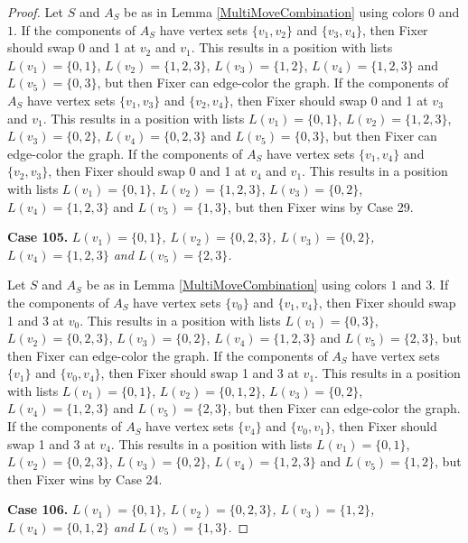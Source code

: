 \documentclass[12pt]{amsart}
\theoremstyle{plain}
\theoremstyle{definition}
\theoremstyle{remark}
\begin{document}
\begin{proof}
Let $S$ and $A_S$ be as in Lemma \ref{MultiMoveCombination} using colors $0$ and $1$. If the components of $A_S$ have vertex sets $\{v_1, v_2\}$ and $\{v_3, v_4\}$, then Fixer should swap 0 and 1 at $v_2$ and $v_1$. This results in a position with lists $L(v_1) = \{0, 1\}$, $L(v_2) = \{1, 2, 3\}$, $L(v_3) = \{1, 2\}$, $L(v_4) = \{1, 2, 3\}$ and $L(v_5) = \{0, 3\}$, but then Fixer can edge-color the graph.
If the components of $A_S$ have vertex sets $\{v_1, v_3\}$ and $\{v_2, v_4\}$, then Fixer should swap 0 and 1 at $v_3$ and $v_1$. This results in a position with lists $L(v_1) = \{0, 1\}$, $L(v_2) = \{1, 2, 3\}$, $L(v_3) = \{0, 2\}$, $L(v_4) = \{0, 2, 3\}$ and $L(v_5) = \{0, 3\}$, but then Fixer can edge-color the graph.
If the components of $A_S$ have vertex sets $\{v_1, v_4\}$ and $\{v_2, v_3\}$, then Fixer should swap 0 and 1 at $v_4$ and $v_1$. This results in a position with lists $L(v_1) = \{0, 1\}$, $L(v_2) = \{1, 2, 3\}$, $L(v_3) = \{0, 2\}$, $L(v_4) = \{1, 2, 3\}$ and $L(v_5) = \{1, 3\}$, but then Fixer wins by Case 29.

\noindent\textbf{Case 105.  }\textit{$L(v_1) = \{0, 1\}$, $L(v_2) = \{0, 2, 3\}$, $L(v_3) = \{0, 2\}$, $L(v_4) = \{1, 2, 3\}$ and $L(v_5) = \{2, 3\}$.}

Let $S$ and $A_S$ be as in Lemma \ref{MultiMoveCombination} using colors $1$ and $3$. If the components of $A_S$ have vertex sets $\{v_0\}$ and $\{v_1, v_4\}$, then Fixer should swap 1 and 3 at $v_0$. This results in a position with lists $L(v_1) = \{0, 3\}$, $L(v_2) = \{0, 2, 3\}$, $L(v_3) = \{0, 2\}$, $L(v_4) = \{1, 2, 3\}$ and $L(v_5) = \{2, 3\}$, but then Fixer can edge-color the graph.
If the components of $A_S$ have vertex sets $\{v_1\}$ and $\{v_0, v_4\}$, then Fixer should swap 1 and 3 at $v_1$. This results in a position with lists $L(v_1) = \{0, 1\}$, $L(v_2) = \{0, 1, 2\}$, $L(v_3) = \{0, 2\}$, $L(v_4) = \{1, 2, 3\}$ and $L(v_5) = \{2, 3\}$, but then Fixer can edge-color the graph.
If the components of $A_S$ have vertex sets $\{v_4\}$ and $\{v_0, v_1\}$, then Fixer should swap 1 and 3 at $v_4$. This results in a position with lists $L(v_1) = \{0, 1\}$, $L(v_2) = \{0, 2, 3\}$, $L(v_3) = \{0, 2\}$, $L(v_4) = \{1, 2, 3\}$ and $L(v_5) = \{1, 2\}$, but then Fixer wins by Case 24.

\noindent\textbf{Case 106.  }\textit{$L(v_1) = \{0, 1\}$, $L(v_2) = \{0, 2, 3\}$, $L(v_3) = \{1, 2\}$, $L(v_4) = \{0, 1, 2\}$ and $L(v_5) = \{1, 3\}$.}


\end{proof}
\end{document}
